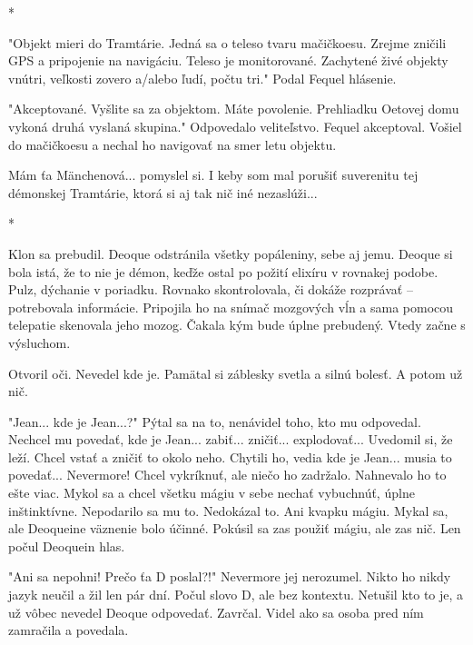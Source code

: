 \documentclass{book}
\begin{document}
\begin{center}

*

\end{center}

"$ $Objekt mieri do Tramtárie. Jedná sa o teleso tvaru mačičkoesu. Zrejme zničili GPS a pripojenie na navigáciu. Teleso je monitorované. Zachytené živé objekty vnútri, veľkosti zovero a/alebo ľudí, počtu tri."$ $ Podal Fequel hlásenie.

"$ $Akceptované. Vyšlite sa za objektom. Máte povolenie. Prehliadku Oetovej domu vykoná druhá vyslaná skupina."$ $ Odpovedalo veliteľstvo. Fequel akceptoval. Vošiel do mačičkoesu a nechal ho navigovať na smer letu objektu.

Mám ťa Mänchenová... pomyslel si. I keby som mal porušiť suverenitu tej démonskej Tramtárie, ktorá si aj tak nič iné nezaslúži...

\begin{center}

*

\end{center}

Klon sa prebudil. Deoque odstránila všetky popáleniny, sebe aj jemu. Deoque si bola istá, že to nie je démon, keďže ostal po požití elixíru v rovnakej podobe. Pulz, dýchanie v poriadku. Rovnako skontrolovala, či dokáže rozprávať – potrebovala informácie. Pripojila ho na snímač mozgových vĺn a sama pomocou telepatie skenovala jeho mozog. Čakala kým bude úplne prebudený. Vtedy začne s výsluchom.

Otvoril oči. Nevedel kde je. Pamätal si záblesky svetla a silnú bolesť. A potom už nič.

"$ $Jean... kde je Jean...?"$ $ Pýtal sa na to, nenávidel toho, kto mu odpovedal. Nechcel mu povedať, kde je Jean... zabiť... zničiť... explodovať... Uvedomil si, že leží. Chcel vstať a zničiť to okolo neho. Chytili ho, vedia kde je Jean... musia to povedať... Nevermore! Chcel vykríknuť, ale niečo ho zadržalo. Nahnevalo ho to ešte viac. Mykol sa a chcel všetku mágiu v sebe nechať vybuchnúť, úplne inštinktívne. Nepodarilo sa mu to. Nedokázal to. Ani kvapku mágiu. Mykal sa, ale Deoqueine väznenie bolo účinné. Pokúsil sa zas použiť mágiu, ale zas nič. Len počul Deoquein hlas.

"$ $Ani sa nepohni! Prečo ťa D poslal?!"$ $ Nevermore jej nerozumel. Nikto ho nikdy jazyk neučil a žil len pár dní. Počul slovo D, ale bez kontextu. Netušil kto to je, a už vôbec nevedel Deoque odpovedať. Zavrčal. Videl ako sa osoba pred ním zamračila a povedala.
\end{document}
